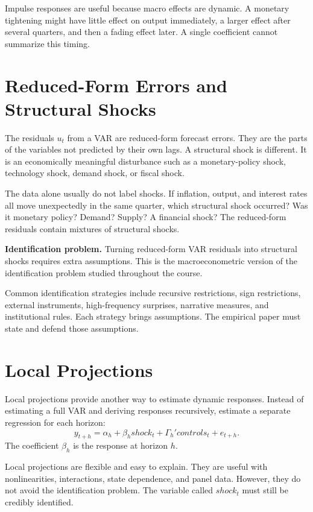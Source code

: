 Impulse responses are useful because macro effects are dynamic. A monetary tightening might have little effect on output immediately, a larger effect after several quarters, and then a fading effect later. A single coefficient cannot summarize this timing.

\section{Reduced-Form Errors and Structural Shocks}

The residuals \(u_t\) from a VAR are reduced-form forecast errors. They are the parts of the variables not predicted by their own lags. A structural shock is different. It is an economically meaningful disturbance such as a monetary-policy shock, technology shock, demand shock, or fiscal shock.

The data alone usually do not label shocks. If inflation, output, and interest rates all move unexpectedly in the same quarter, which structural shock occurred? Was it monetary policy? Demand? Supply? A financial shock? The reduced-form residuals contain mixtures of structural shocks.

\begin{boxD}
\textbf{Identification problem.} Turning reduced-form VAR residuals into structural shocks requires extra assumptions. This is the macroeconometric version of the identification problem studied throughout the course.
\end{boxD}

Common identification strategies include recursive restrictions, sign restrictions, external instruments, high-frequency surprises, narrative measures, and institutional rules. Each strategy brings assumptions. The empirical paper must state and defend those assumptions.

\section{Local Projections}

Local projections provide another way to estimate dynamic responses. Instead of estimating a full VAR and deriving responses recursively, estimate a separate regression for each horizon:
\[
    y_{t+h}=\alpha_h+\beta_h shock_t+\Gamma_h'controls_t+e_{t+h}.
\]
The coefficient \(\beta_h\) is the response at horizon \(h\).

Local projections are flexible and easy to explain. They are useful with nonlinearities, interactions, state dependence, and panel data. However, they do not avoid the identification problem. The variable called \(shock_t\) must still be credibly identified.

